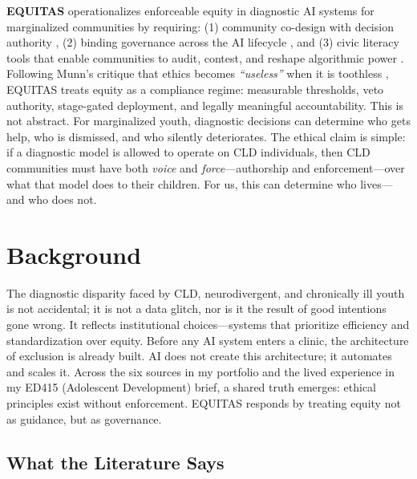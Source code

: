 \documentclass[12pt,a4paper]{article}
\begin{document}
\vspace{0.5em}
\textbf{EQUITAS} operationalizes enforceable equity in diagnostic AI systems for marginalized communities by requiring: (1) community co-design with decision authority \citep{Nadarzynski2024}, (2) binding governance across the AI lifecycle \citep{Lekadir2025}, and (3) civic literacy tools that enable communities to audit, contest, and reshape algorithmic power \citep{SocialJusticeStandards2018, Wiegand2020}. Following Munn’s critique that ethics becomes \textit{``useless''} when it is toothless \citep{Munn2023}, EQUITAS treats equity as a compliance regime: measurable thresholds, veto authority, stage-gated deployment, and legally meaningful accountability. This is not abstract. For marginalized youth, diagnostic decisions can determine who gets help, who is dismissed, and who silently deteriorates. The ethical claim is simple: if a diagnostic model is allowed to operate on CLD individuals, then CLD communities must have both \emph{voice} and \emph{force}—authorship and enforcement—over what that model does to their children. For us, this can determine who lives—and who does not.





\newpage
\section{Background}

The diagnostic disparity faced by CLD, neurodivergent, and chronically ill youth is not accidental; it is not a data glitch, nor is it the result of good intentions gone wrong. It reflects institutional choices—systems that prioritize efficiency and standardization over equity. Before any AI system enters a clinic, the architecture of exclusion is already built. AI does not create this architecture; it automates and scales it. Across the six sources in my portfolio and the lived experience in my ED415 (Adolescent Development) brief, a shared truth emerges: ethical principles exist without enforcement. EQUITAS responds by treating equity not as guidance, but as governance.

\subsection{What the Literature Says}
\end{document}
